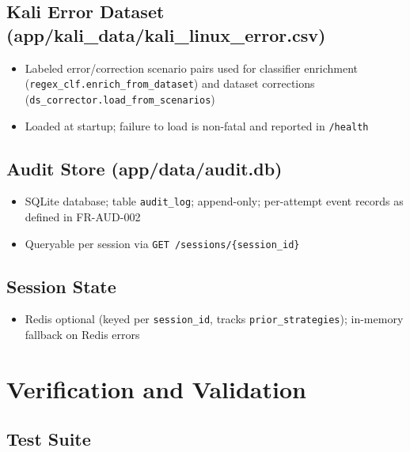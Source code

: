 \documentclass[10pt,journal,onecolumn]{IEEEtran}
\begin{document}
\subsection{Kali Error Dataset (app/kali\_data/kali\_linux\_error.csv)}

\begin{itemize}
\item Labeled error/correction scenario pairs used for classifier enrichment (\texttt{regex\_\allowbreak clf.\allowbreak enrich\_\allowbreak from\_\allowbreak dataset}) and dataset corrections (\texttt{ds\_\allowbreak corrector.\allowbreak load\_\allowbreak from\_\allowbreak scenarios})
\item Loaded at startup; failure to load is non-fatal and reported in \texttt{/health}
\end{itemize}

\subsection{Audit Store (app/data/audit.db)}

\begin{itemize}
\item SQLite database; table \texttt{audit\_log}; append-only; per-attempt event records as defined in FR-AUD-002
\item Queryable per session via \texttt{GET /\allowbreak sessions/\allowbreak \{session\_\allowbreak id\}}
\end{itemize}

\subsection{Session State}

\begin{itemize}
\item Redis optional (keyed per \texttt{session\_id}, tracks \texttt{prior\_strategies}); in-memory fallback on Redis errors
\end{itemize}

\section{Verification and Validation}

\subsection{Test Suite}
\end{document}
